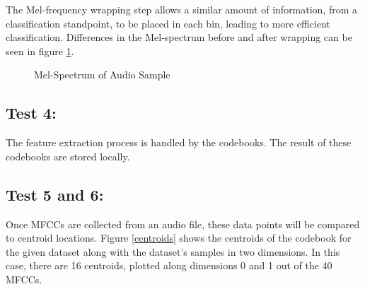 \documentclass[conference]{IEEEtran}
\begin{document}
    The Mel-frequency wrapping step allows a similar amount of information, from a classification standpoint, to be placed in each bin, leading to more efficient classification. Differences in the Mel-spectrum before and after wrapping can be seen in figure \ref{mel_spec}.

    \begin{figure}
        \centering
        \hfill
        \label{mel_spec}
        \caption{Mel-Spectrum of Audio Sample}
    \end{figure}

    \subsection*{Test 4:}
    The feature extraction process is handled by the codebooks. The result of these codebooks are stored locally.

    \subsection*{Test 5 and 6:}
    Once MFCCs are collected from an audio file, these data points will be compared to centroid locations. Figure \ref{centroids} shows the centroids of the codebook for the given dataset along with the dataset's samples in two dimensions. In this case, there are 16 centroids, plotted along dimensions 0 and 1 out of the 40 MFCCs.
\end{document}
